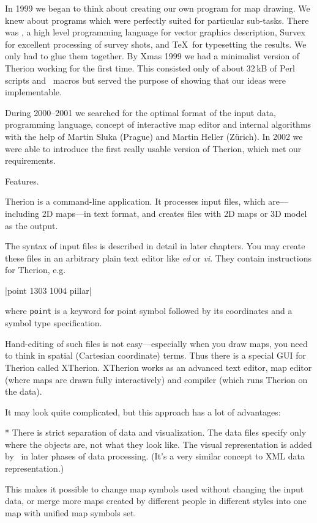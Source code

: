In 1999 we began to think about creating our own program for map drawing. We knew
about programs which were perfectly suited for particular sub-tasks. There
was \MP, a high level programming language for vector graphics description,
Survex for excellent processing of survey shots, and \TeX\ for typesetting the
results. We only had to glue them together. By Xmas
1999 we had a minimalist version of Therion working for the first time. This
consisted only of about 32\,kB of Perl scripts and \MP\ macros but served the
purpose of showing that our ideas were implementable.

During 2000--2001 we searched for the optimal format of the input data, programming
language, concept of interactive map editor and internal algorithms with the
help of Martin Sluka (Prague) and Martin Heller (Z\"urich). In 2002 we were able to
introduce the first really usable version of Therion, which met our requirements.


\subchapter Features.

Therion is a command-line application. It processes input files, which
are---including 2D maps---in text format, and creates files with 2D maps or
3D model as the output.

The syntax of input files is described in detail in later chapters.
You may create these files in an arbitrary plain text editor like
{\it ed} or {\it vi}. They contain instructions for Therion, e.g.

|point 1303 1004 pillar|

where {\tt point} is a keyword for point symbol
followed by its coordinates and a symbol type specification.

Hand-editing of such files is not easy---especially when you draw maps, you
need to think in spatial (Cartesian coordinate) terms. Thus there is a special
GUI for Therion called XTherion. XTherion works as an advanced text editor, map
editor (where maps are drawn fully interactively) and compiler (which runs
Therion on the data).

It may look quite complicated, but this approach has a lot of advantages:

\list
* There is strict separation of data and visualization. The data files specify
  only where the objects are, not what they look like. The visual representation
  is added by \MP\ in later phases of data processing. (It's a very
  similar concept to XML data representation.)

  This makes it possible to change map symbols used without changing the
  input data, or merge more maps created by different people in different
  styles into one map with unified map symbols set.

